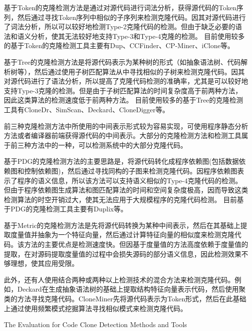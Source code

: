 基于Token的克隆检测方法是通过对源代码进行词法分析，获得源代码的Token序列，然后通过寻找Token序列中相似的子序列来检测克隆代码。因其对源代码进行了词法分析，所以可以较好地检测Type-2克隆代码的检测。但由于缺乏必要的语法和语义分析，使其无法较好地支持Type-3和Type-4克隆的检测。
目前使用较多的基于Token的克隆检测工具主要有Dup\cite{baker1995finding}、CCFinder\cite{kamiya2002ccfinder}、CP-Miner\cite{li2006cp}、iClone\cite{gode2009incremental}等。

基于Tree的克隆检测方法是将源代码表示为某种树的形式（如抽象语法树、代码解析树等），然后通过使用子树匹配算法从中寻找相似的子树来检测克隆代码。因其对源代码进行了语法分析，所以提高了克隆代码检测的准确率，尤其是可以较好地支持Type-3克隆的检测。但是由于子树匹配算法的时间复杂度高于前两种方法，因此这类算法的检测速度低于前两种方法。
目前使用较多的基于Tree的克隆检测工具有CloneDr\cite{baxter1998clone}、SimScan\cite{SimScan}、Deckard\cite{jiang2007deckard}、CloneDigger\cite{bulychev2008duplicate}等。

前三种克隆检测方法中所使用的中间表示形式较为容易实现，可使用程序静态分析方法或者编译器前端获得源代码的中间表示。大部分的克隆检测方法和检测工具属于前三种方法中的一种，可以检测系统中的大部分克隆代码。

基于PDG的克隆检测方法的主要思路是，将源代码转化成程序依赖图(包括数据依赖图和控制依赖图)，然后通过寻找同构的子图来检测克隆代码。因程序依赖图表示了程序的语义信息，所以该方法可以支持语义相似的Type-4克隆代码的检测。但由于程序依赖图生成算法和图匹配算法的时间和空间复杂度极高，因而导致这类检测算法的时空开销过大，使其无法应用于大规模程序的克隆代码检测。
目前基于PDG的克隆检测工具主要有Duplix\cite{krinke2001identifying}等。

基于Metric的克隆检测方法是先将源代码转换为某种中间表示，然后在其基础上提取度量值并抽象为一个特征向量，然后通过计算特征向量的相似度来检测克隆代码。该方法的主要优点是检测速度快。但因基于度量值的方法高度依赖于度量值的提取，在对源码提取度量值的过程中会损失源码的部分语义信息，因此检测效果不够理想，使其应用受限。

此外，还有人使用结合两种或两种以上检测技术的混合方法来检测克隆代码。例如，Deckard在生成抽象语法树的基础上提取结构特征向量表示代码，然后使用聚类的方法寻找克隆代码\cite{jiang2007deckard}。CloneMiner先将源代码表示为Token形式，然后在此基础上通过使用频繁模式挖掘算法寻找相似模式来检测克隆代码\cite{basit2009data}。


{The Evaluation for Code Clone Detection Methods and Tools}

